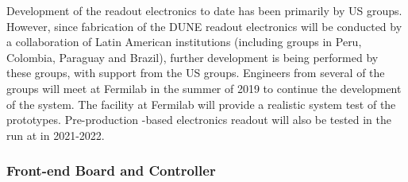 
Development of the readout electronics to date has been primarily by US groups. 
However, since fabrication of the DUNE readout electronics will be conducted by a collaboration of Latin American institutions (including groups in Peru, Colombia, Paraguay and Brazil), further development is being performed by these groups, with support from the US groups.  Engineers from several of the groups will meet at Fermilab in the summer of 2019 to continue the development of the system. The  facility at Fermilab will provide a realistic system test of the prototypes.  Pre-production -based electronics readout will also be tested in the  run at  in 2021-2022.



\subsubsection{Front-end Board and Controller}

